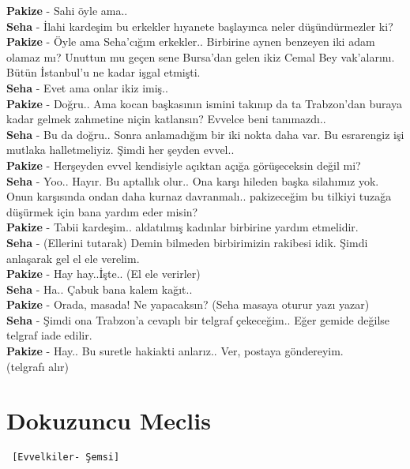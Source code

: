 \documentclass[]{book}
\begin{document}
\textbf{Pakize} - Sahi öyle ama..\\
\textbf{Seha} - İlahi kardeşim bu erkekler hıyanete başlayınca neler düşündürmezler ki?\\
\textbf{Pakize} - Öyle ama Seha'cığım erkekler.. Birbirine aynen benzeyen iki adam olamaz mı? Unuttun mu geçen sene Bursa'dan gelen ikiz Cemal Bey vak'alarını. Bütün İstanbul'u ne kadar işgal etmişti.\\
\textbf{Seha} - Evet ama onlar ikiz imiş..\\
\textbf{Pakize} - Doğru.. Ama kocan başkasının ismini takınıp da ta Trabzon'dan buraya kadar gelmek zahmetine niçin katlansın? Evvelce beni tanımazdı..\\
\textbf{Seha} - Bu da doğru.. Sonra anlamadığım bir iki nokta daha var. Bu esrarengiz işi mutlaka halletmeliyiz. Şimdi her şeyden evvel..\\
\textbf{Pakize} - Herşeyden evvel kendisiyle açıktan açığa görüşeceksin değil mi?\\
\textbf{Seha} - Yoo.. Hayır. Bu aptallık olur.. Ona karşı hileden başka silahımız yok. Onun karşısında ondan daha kurnaz davranmalı.. pakizeceğim bu tilkiyi tuzağa düşürmek için bana yardım eder misin?\\
\textbf{Pakize} - Tabii kardeşim.. aldatılmış kadınlar birbirine yardım etmelidir.\\
\textbf{Seha} - (Ellerini tutarak) Demin bilmeden birbirimizin rakibesi idik. Şimdi anlaşarak gel el ele verelim.\\
\textbf{Pakize} - Hay hay..İşte.. (El ele verirler)\\
\textbf{Seha} - Ha.. Çabuk bana kalem kağıt..\\
\textbf{Pakize} - Orada, masada! Ne yapacaksın? (Seha masaya oturur yazı yazar)\\
\textbf{Seha} - Şimdi ona Trabzon'a cevaplı bir telgraf çekeceğim.. Eğer gemide değilse telgraf iade edilir.\\
\textbf{Pakize} - Hay.. Bu suretle hakiakti anlarız.. Ver, postaya göndereyim. ~\\
(telgrafı alır)

\hypertarget{dokuzuncu-meclis-1}{%
\section{Dokuzuncu Meclis}\label{dokuzuncu-meclis-1}}

\begin{verbatim}
 [Evvelkiler- Şemsi]
\end{verbatim}
\end{document}
